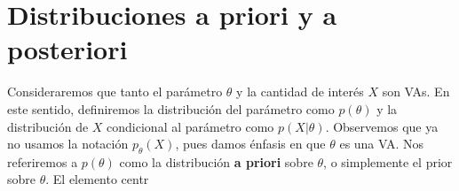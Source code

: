  \section{Distribuciones a priori y a posteriori} 
 \label{sec:distribuciones_a_priori_y_a_posteriori}
 
Consideraremos que tanto el parámetro $\theta$ y la cantidad de interés $X$ son VAs. En este sentido, definiremos la distribución del parámetro como $p(\theta)$ y la distribución de $X$ condicional al parámetro como $p(X|\theta)$. Observemos que ya no usamos la notación $p_\theta(X)$, pues damos énfasis en que $\theta$ es una VA. Nos referiremos a $p(\theta)$ como la distribución \textbf{a priori} sobre $\theta$, o simplemente el prior sobre $\theta$. 
El elemento centr